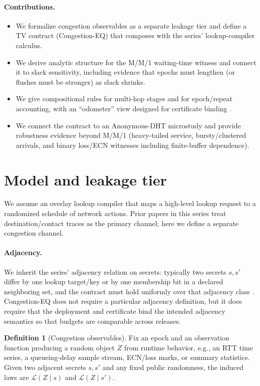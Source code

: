\documentclass[11pt]{article}
\theoremstyle{definition}
\newtheorem{definition}{Definition}
\theoremstyle{remark}
\begin{document}
\paragraph{Contributions.}
\begin{itemize}[leftmargin=1.2em]
\item We formalize congestion observables as a separate leakage tier and define a TV contract (Congestion-EQ) that composes with the series' lookup-compiler calculus.
\item We derive analytic structure for the M/M/1 waiting-time witness and connect it to slack sensitivity, including evidence that epochs must lengthen (or flushes must be stronger) as slack shrinks.
\item We give compositional rules for multi-hop stages and for epoch/repeat accounting, with an ``odometer'' view designed for certificate binding \cite{series:wcongeq}.
\item We connect the contract to an Anonymous-DHT microstudy and provide robustness evidence beyond M/M/1 (heavy-tailed service, bursty/clustered arrivals, and binary loss/ECN witnesses including finite-buffer dependence).
\end{itemize}

\section{Model and leakage tier}
We assume an overlay lookup compiler that maps a high-level lookup request to a randomized schedule of network actions.
Prior papers in this series treat destination/contact traces as the primary channel; here we define a separate congestion channel.

\paragraph{Adjacency.}
We inherit the series' adjacency relation on secrets: typically two secrets $s,s'$ differ by one lookup target/key or by one membership bit in a declared neighboring set, and the contract must hold uniformly over that adjacency class \cite{series:schedcompiler}.
Congestion-EQ does not require a particular adjacency definition, but it does require that the deployment and certificate bind the intended adjacency semantics so that budgets are comparable across releases.

\begin{definition}[Congestion observables]
Fix an epoch and an observation function producing a random object $Z$ from runtime behavior, e.g., an RTT time series, a queueing-delay sample stream, ECN/loss marks, or summary statistics.
Given two adjacent secrets $s,s'$ and any fixed public randomness, the induced laws are $\mathcal{L}(Z\mid s)$ and $\mathcal{L}(Z\mid s')$.
\end{definition}
\end{document}

